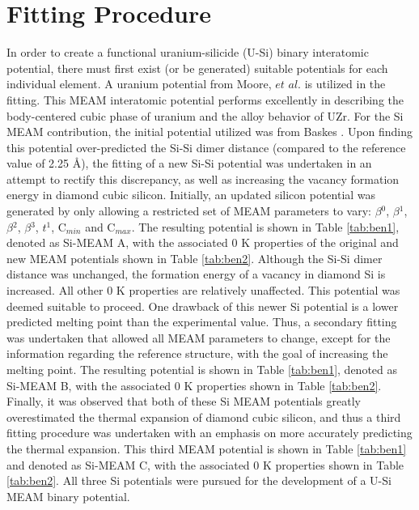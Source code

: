 \documentclass[review]{elsarticle}
\begin{document}
\section{Fitting Procedure}
In order to create a functional uranium-silicide (U-Si) binary interatomic potential, there must first exist (or be generated) suitable potentials for each individual element.  A uranium potential from Moore, $\textit{et al.}$ \cite{moore2015} is utilized in the fitting.  This MEAM interatomic potential performs excellently in describing the body-centered cubic phase of uranium and the alloy behavior of UZr.  For the Si MEAM contribution, the initial potential utilized was from Baskes \cite{baskes1992}.  Upon finding this potential over-predicted the Si-Si dimer distance (compared to the reference value of 2.25 \AA \cite{huber1979}), the fitting of a new Si-Si potential was undertaken in an attempt to rectify this discrepancy, as well as increasing the vacancy formation energy in diamond cubic silicon.  Initially, an updated silicon potential was generated by only allowing a restricted set of MEAM parameters to vary: $\beta$$^{0}$, $\beta$$^{1}$, $\beta$$^{2}$, $\beta$$^{3}$, $t$$^{1}$, C$_{min}$ and C$_{max}$.  The resulting potential is shown in Table \ref{tab:ben1}, denoted as Si-MEAM A, with the associated 0 K properties of the original and new MEAM potentials shown in Table \ref{tab:ben2}.  Although the Si-Si dimer distance was unchanged, the formation energy of a vacancy in diamond Si is increased.  All other 0 K properties are relatively unaffected.  This potential was deemed suitable to proceed.  One drawback of this newer Si potential is a lower predicted melting point than the experimental value.  Thus, a secondary fitting was undertaken that allowed all MEAM parameters to change, except for the information regarding the reference structure, with the goal of increasing the melting point.  The resulting potential is shown in Table \ref{tab:ben1}, denoted as Si-MEAM B, with the associated 0 K properties shown in Table \ref{tab:ben2}.  Finally, it was observed that both of these Si MEAM potentials greatly overestimated the thermal expansion of diamond cubic silicon, and thus a third fitting procedure was undertaken with an emphasis on more accurately predicting the thermal expansion.  This third MEAM potential is shown in Table \ref{tab:ben1} and denoted as Si-MEAM C, with the associated 0 K properties shown in Table \ref{tab:ben2}.   All three Si potentials were pursued for the development of a U-Si MEAM binary potential.  
\end{document}
